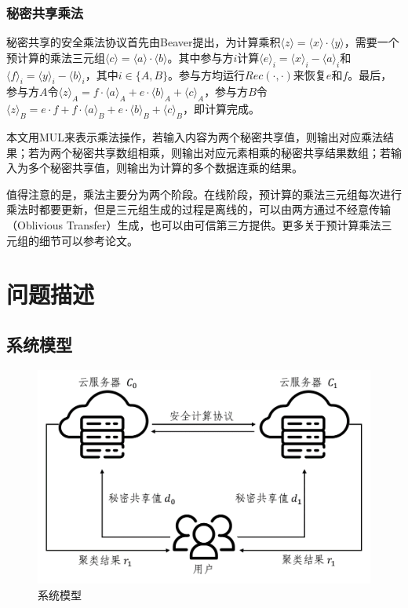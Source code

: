\subsubsection{秘密共享乘法}
秘密共享的安全乘法协议首先由Beaver\cite{beaver1992efficient}提出，为计算乘积$\langle z\rangle=\langle x\rangle \cdot\langle y\rangle$，需要一个预计算的乘法三元组$\langle c\rangle=\langle a\rangle \cdot\langle b\rangle$。其中参与方$ i $计算$ \langle e \rangle_i = \langle x \rangle_i - \langle a \rangle_i $和$\langle f\rangle_i=\langle y\rangle_i-\langle b\rangle_i$，其中$ i \in \{A, B\}$。参与方均运行$ Rec(\cdot, \cdot) $来恢复$ e $和$ f $。最后，参与方$ A $令$\langle z\rangle_A=f \cdot\langle a\rangle_A+e \cdot\langle b\rangle_A+\langle c\rangle_A$，参与方$ B $令$\langle z\rangle_B=e \cdot f+f \cdot\langle a\rangle_B+e \cdot\langle b\rangle_B+\langle c\rangle_B$，即计算完成。

本文用MUL来表示乘法操作，若输入内容为两个秘密共享值，则输出对应乘法结果；若为两个秘密共享数组相乘，则输出对应元素相乘的秘密共享结果数组；若输入为多个秘密共享值，则输出为计算的多个数据连乘的结果。

值得注意的是，乘法主要分为两个阶段。在线阶段，预计算的乘法三元组每次进行乘法时都要更新，但是三元组生成的过程是离线的，可以由两方通过不经意传输（Oblivious Transfer）生成\cite{schneider2013gmw}，也可以由可信第三方提供\cite{riazi2018chameleon}。更多关于预计算乘法三元组的细节可以参考论文\cite{beaver1992efficient}。
\section{问题描述}
\label{s3-wenti}

\subsection{系统模型}
\begin{figure}[htbp]
	\centering
	\includegraphics[width=0.75\linewidth]{img/sysmodel1.png}%
	\caption{系统模型}
	\label{sys model}
\end{figure}


